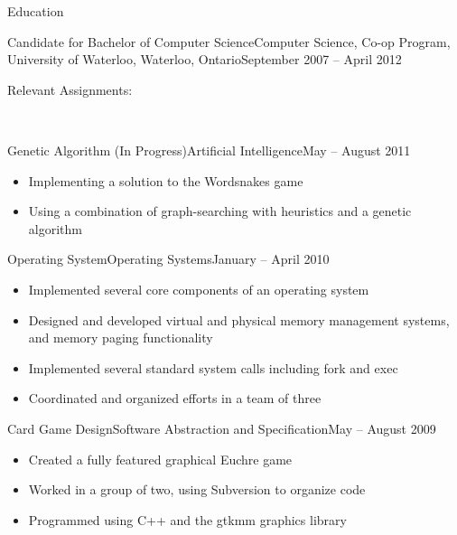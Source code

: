\documentclass[11pt]{article}
\begin{document}
	\begin{section}{Education} \\

		\begin{subsection}{Candidate for Bachelor of Computer Science}{Computer Science, Co-op Program, University of Waterloo, Waterloo, Ontario}{September 2007 -- April 2012}

			\begin{indent}
				\begin{bf}Relevant Assignments:\end{bf} \\

                \begin{subsection}{Genetic Algorithm (In Progress)}{Artificial Intelligence}{May -- August 2011}

					\begin{itemize}
						\item Implementing a solution to the Wordsnakes game
                        \item Using a combination of graph-searching with heuristics and a genetic algorithm
					\end{itemize}

                \end{subsection}

                \begin{subsection}{Operating System}{Operating Systems}{January -- April 2010}

					\begin{itemize}
						\item Implemented several core components of an operating system
                        \item Designed and developed virtual and physical memory management systems, and memory paging functionality
                        \item Implemented several standard system calls including fork and exec
                        \item Coordinated and organized efforts in a team of three
					\end{itemize}

                \end{subsection}

				\begin{subsection}{Card Game Design}{Software Abstraction and Specification}{May -- August 2009}

					\begin{itemize}
						\item Created a fully featured graphical Euchre game
						\item Worked in a group of two, using Subversion to organize code
						\item Programmed using C++ and the gtkmm graphics library
					\end{itemize}

				\end{subsection}
			\end{indent}

		\end{subsection}

	\end{section}
\end{document}
